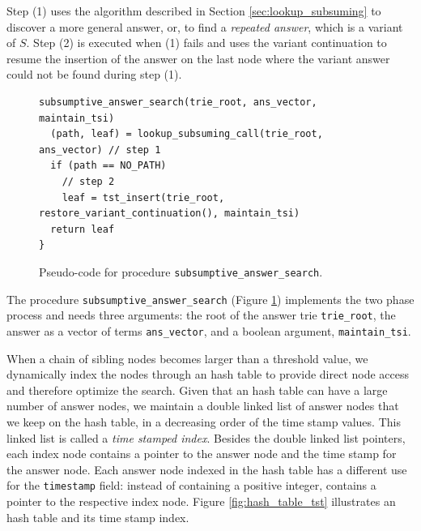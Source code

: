 Step (1) uses the algorithm described in Section \ref{sec:lookup_subsuming} to discover a more general answer, or,
to find a \textit{repeated answer}, which is a variant of $S$.
Step (2) is executed when (1) fails and uses the variant continuation to resume the insertion of the answer
on the last node where the variant answer could not be found during step (1).

\begin{figure}[ht]
\begin{Verbatim}
subsumptive_answer_search(trie_root, ans_vector, maintain_tsi)
  (path, leaf) = lookup_subsuming_call(trie_root, ans_vector) // step 1
  if (path == NO_PATH)
    // step 2
    leaf = tst_insert(trie_root, restore_variant_continuation(), maintain_tsi)
  return leaf
}
\end{Verbatim}
\caption{Pseudo-code for procedure \texttt{subsumptive\_answer\_search}.}
\label{fig:subsumptive_answer_search}
\end{figure}

The procedure \texttt{subsumptive\_answer\_search} (Figure \ref{fig:subsumptive_answer_search})
implements the two phase process and needs three arguments: the root of the answer trie \texttt{trie\_root},
the answer as a vector of terms \texttt{ans\_vector}, and a boolean argument, \texttt{maintain\_tsi}.

When a chain of sibling nodes becomes larger than a threshold value, we dynamically index the nodes through an hash table to provide direct node access and therefore optimize the search. Given that an hash table
can have a large number of answer nodes, we maintain a double linked list of answer nodes that we keep on the hash
table, in a decreasing order of the time stamp values. This linked list is called a \textit{time stamped index}.
Besides the double linked list pointers, each index node contains a pointer to the answer node
and the time stamp for the answer node. Each answer node indexed in the hash table has a different use
for the \texttt{timestamp} field: instead of containing a positive integer, contains a pointer to the respective index node. Figure \ref{fig:hash_table_tst} illustrates an hash table and its time stamp index.

